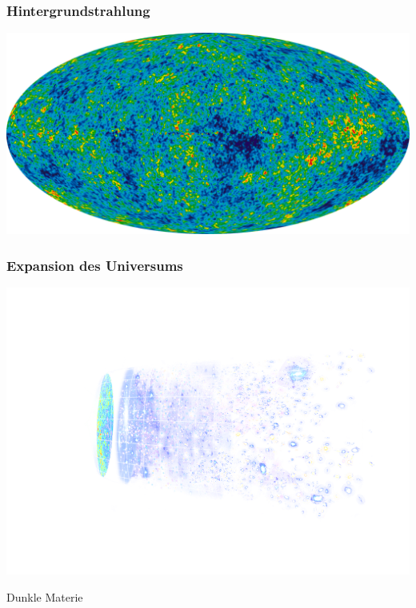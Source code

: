 \documentclass[14pt]{beamer}
\begin{document}
\begin{frame}
	\frametitle{Hintergrundstrahlung}
	\begin{center}
		\includegraphics[width=\textwidth]{hintergrundstrahlung.png}
	\end{center}
\end{frame}
	
\begin{frame}
	\frametitle{Expansion des Universums}
	\begin{center}
		\includegraphics[width=\textwidth]{expansion.png}
	\end{center}
\end{frame}
	
\begin{frame}
	\centering
	\huge{Dunkle Materie}
\end{frame}
\end{document}
